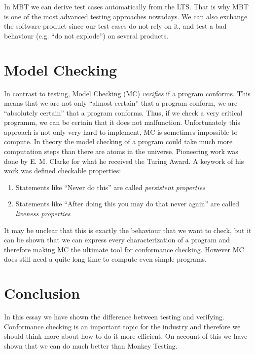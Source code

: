 \documentclass[a4paper, 12pt]{article} %
\begin{document}
In MBT we can derive test cases automatically from the LTS. That is why MBT
is one of the most advanced testing approaches nowadays. We can also exchange
the software product since our test cases do not rely on it, and test a bad
behaviour (e.g. ``do not explode'') on several products. 

\section*{Model Checking}
In contrast to testing, Model Checking (MC) \textit{verifies} if a program
conforms. This means that we are not only ``almost certain'' that a program
conform, we are ``absolutely certain'' that a program conforms. Thus, if we
check a very critical programm, we can be certain that it does not malfunction.
Unfortunately this approach is not only very hard to implement, MC is sometimes
impossible to compute. In theory the model checking of a program could take much
more computation steps than there are atoms in the universe. Pioneering work was
done by E. M. Clarke for what he received the Turing Award. A keywork of
his work was defined checkable properties:
\begin{enumerate}
  \item Statements like ``Never do {\color{red}this}'' are called
  \textit{persistent properties}
  \item Statements like ``After doing {\color{red}this} you may do
  {\color{blue}that} never again'' are called \textit{liveness properties}
\end{enumerate}

It may be unclear that this is exactly the behaviour that we want to check, but
it can be shown that we can express every characterization of a program and
therefore making MC the ultimate tool for conformance checking. However MC does
still need a quite long time to compute even simple programs. 


\section*{Conclusion}
In this essay we have shown the difference between testing and verifying. 
Conformance checking is an important topic for the industry and therefore we
should think more about how to do it more efficient. On account of this we have
shown that we can do much better than Monkey Testing.





\end{document}
